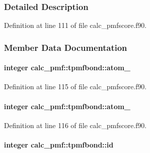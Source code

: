 \subsubsection{Detailed Description}


Definition at line 111 of file calc\-\_\-pmfscore.\-f90.



\subsubsection{Member Data Documentation}
\hypertarget{structcalc__pmf_1_1tpmfbond_a8868d3338a4906150f063d44edc09a40}{
\paragraph[{atom\-\_\-1}]{\setlength{\rightskip}{0pt plus 5cm}integer calc\-\_\-pmf\-::tpmfbond\-::atom\-\_}}\label{structcalc__pmf_1_1tpmfbond_a8868d3338a4906150f063d44edc09a40}


Definition at line 115 of file calc\-\_\-pmfscore.\-f90.

\hypertarget{structcalc__pmf_1_1tpmfbond_a38a1cb34c193e9ac7d4db82eb6d3c219}{
\paragraph[{atom\-\_\-2}]{\setlength{\rightskip}{0pt plus 5cm}integer calc\-\_\-pmf\-::tpmfbond\-::atom\-\_}}\label{structcalc__pmf_1_1tpmfbond_a38a1cb34c193e9ac7d4db82eb6d3c219}


Definition at line 116 of file calc\-\_\-pmfscore.\-f90.

\hypertarget{structcalc__pmf_1_1tpmfbond_a3046e41b5febad41a413b6279c84b63e}{
\paragraph[{id}]{\setlength{\rightskip}{0pt plus 5cm}integer calc\-\_\-pmf\-::tpmfbond\-::id}}\label{structcalc__pmf_1_1tpmfbond_a3046e41b5febad41a413b6279c84b63e}


